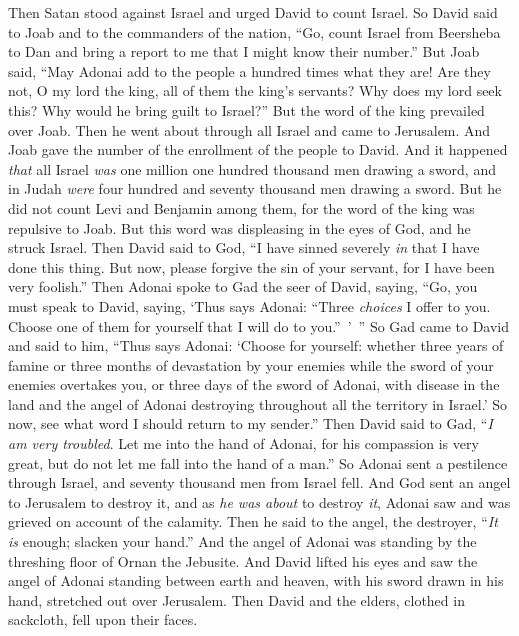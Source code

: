 \begin{biblechapter} %
 Then Satan stood against Israel and urged David to count Israel.
\verse So David said to Joab and to the commanders of the nation, “Go, count Israel from Beersheba to Dan and bring a report to me that I might know their number.”
\verse But Joab said, “May Adonai add to the people a hundred times what they are! Are they not, O my lord the king, all of them the king’s servants? Why does my lord seek this? Why would he bring guilt to Israel?”
\verse But the word of the king prevailed over Joab. Then he went about through all Israel and came to Jerusalem.
\verse And Joab gave the number of the enrollment of the people to David. And it happened \textit{that} all Israel \textit{was} one million one hundred thousand men drawing a sword, and in Judah \textit{were} four hundred and seventy thousand men drawing a sword.
\verse But he did not count Levi and Benjamin among them, for the word of the king was repulsive to Joab.
\verse But this word was displeasing in the eyes of God, and he struck Israel.
\verse Then David said to God, “I have sinned severely \textit{in} that I have done this thing. But now, please forgive the sin of your servant, for I have been very foolish.”
\verse Then Adonai spoke to Gad the seer of David, saying,
\verse “Go, you must speak to David, saying, ‘Thus says Adonai: “Three \textit{choices} I offer to you. Choose one of them for yourself that I will do to you.” ’ ”
\verse So Gad came to David and said to him, “Thus says Adonai: ‘Choose for yourself:
\verse whether three years of famine or three months of devastation by your enemies while the sword of your enemies overtakes you, or three days of the sword of Adonai, with disease in the land and the angel of Adonai destroying throughout all the territory in Israel.’ So now, see what word I should return to my sender.”
\verse Then David said to Gad, “\textit{I am very troubled}. Let me into the hand of Adonai, for his compassion is very great, but do not let me fall into the hand of a man.”
\verse So Adonai sent a pestilence through Israel, and seventy thousand men from Israel fell.
\verse And God sent an angel to Jerusalem to destroy it, and as \textit{he was about} to destroy \textit{it}, Adonai saw and was grieved on account of the calamity. Then he said to the angel, the destroyer, “\textit{It is} enough; slacken your hand.” And the angel of Adonai was standing by the threshing floor of Ornan the Jebusite.
\verse And David lifted his eyes and saw the angel of Adonai standing between earth and heaven, with his sword drawn in his hand, stretched out over Jerusalem. Then David and the elders, clothed in sackcloth, fell upon their faces.

\end{biblechapter}
